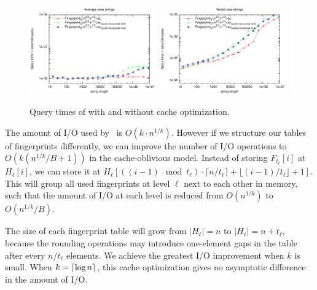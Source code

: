 \documentclass[a4]{article}
\begin{document}
\begin{figure}[tp]
    \begin{center}
        \includegraphics[width=0.49\textwidth,type=pdf,ext=.pdf,read=.pdf]{../src/results/length-fingerprint3-cache-rand10.plt}
        \includegraphics[width=0.49\textwidth,type=pdf,ext=.pdf,read=.pdf]{../src/results/length-fingerprint3-cache-alla.plt}
    \end{center}
    \caption{\label{fig:plot-fingerprint3-cache}Query times of \fprint[3] with and without cache optimization.}
\end{figure}


The amount of I/O used by \fprintk\ is $O(k\cdot n^{1/k})$. However if we structure our tables of fingerprints differently, we can improve the number of I/O operations to $O(k(n^{1/k}/B+1))$ in the cache-oblivious model. Instead of storing $F_{t_\ell}[i]$ at $H_\ell[i]$, we can store it at $H_\ell[((i-1)\mod t_\ell)\cdot\lceil n/t_\ell\rceil+\lfloor (i-1)/t_\ell\rfloor+1]$. This will group all used fingerprints at level $\ell$ next to each other in memory, such that the amount of I/O at each level is reduced from $O(n^{1/k})$ to $O(n^{1/k}/B)$.

The size of each fingerprint table will grow from $|H_\ell| = n$ to $|H_\ell| = n+t_\ell$, because the rounding operations may introduce one-element gaps in the table after every $n/t_\ell$ elements. We achieve the greatest I/O improvement when $k$ is small. When $k=\lceil\log n\rceil$, this cache optimization gives no asymptotic difference in the amount of I/O.
\end{document}
